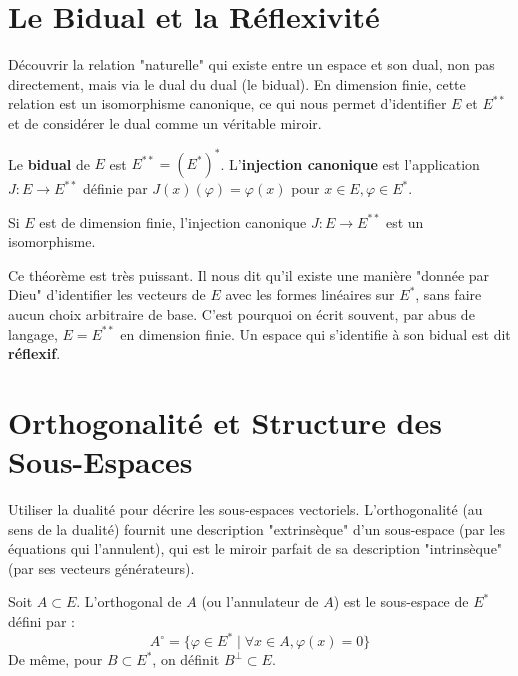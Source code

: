 \section{Le Bidual et la Réflexivité}

\begin{objectif}
    Découvrir la relation "naturelle" qui existe entre un espace et son dual, non pas directement, mais via le dual du dual (le bidual). En dimension finie, cette relation est un isomorphisme canonique, ce qui nous permet d'identifier $E$ et $E^{**}$ et de considérer le dual comme un véritable miroir.
\end{objectif}

\begin{definition}
    Le \textbf{bidual} de $E$ est $E^{**} = (E^*)^*$.
    L'\textbf{injection canonique} est l'application $J: E \to E^{**}$ définie par $J(x)(\varphi) = \varphi(x)$ pour $x \in E, \varphi \in E^*$.
\end{definition}

\begin{theorem}
    Si $E$ est de dimension finie, l'injection canonique $J: E \to E^{**}$ est un isomorphisme.
\end{theorem}
\begin{remark}
    Ce théorème est très puissant. Il nous dit qu'il existe une manière "donnée par Dieu" d'identifier les vecteurs de $E$ avec les formes linéaires sur $E^*$, sans faire aucun choix arbitraire de base. C'est pourquoi on écrit souvent, par abus de langage, $E=E^{**}$ en dimension finie. Un espace qui s'identifie à son bidual est dit \textbf{réflexif}.
\end{remark}

\section{Orthogonalité et Structure des Sous-Espaces}

\begin{objectif}
    Utiliser la dualité pour décrire les sous-espaces vectoriels. L'orthogonalité (au sens de la dualité) fournit une description "extrinsèque" d'un sous-espace (par les équations qui l'annulent), qui est le miroir parfait de sa description "intrinsèque" (par ses vecteurs générateurs).
\end{objectif}

\begin{definition}
    Soit $A \subset E$. L'orthogonal de $A$ (ou l'annulateur de $A$) est le sous-espace de $E^*$ défini par :
    $$ A^\circ = \{ \varphi \in E^* \mid \forall x \in A, \varphi(x)=0 \} $$
    De même, pour $B \subset E^*$, on définit $B^\perp \subset E$.
\end{definition}

